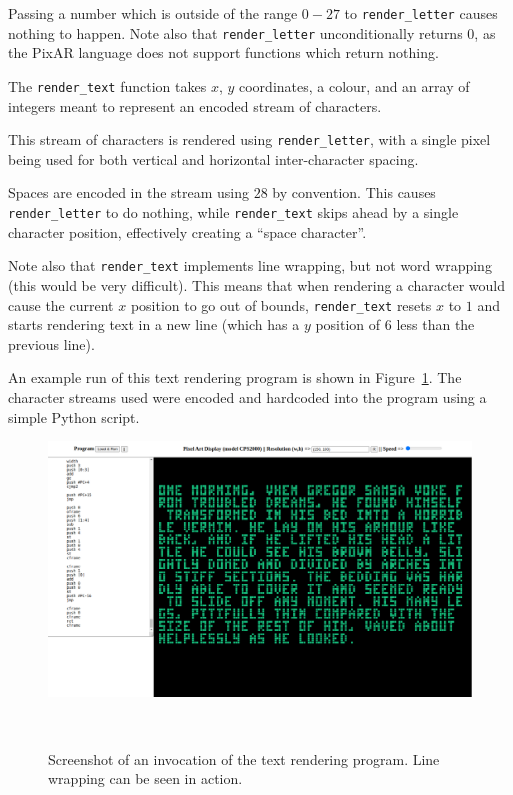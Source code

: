 \documentclass[11pt,a4paper]{scrartcl}
\begin{document}
Passing a number which is outside of the range $0-27$ to \verb|render_letter| causes nothing to happen. Note also that \verb|render_letter| unconditionally returns $0$, as the PixAR language does not support functions which return nothing.

The \verb|render_text| function takes $x$, $y$ coordinates, a colour, and an array of integers meant to represent an encoded stream of characters.

This stream of characters is rendered using \verb|render_letter|, with a single pixel being used for both vertical and horizontal inter-character spacing.

Spaces are encoded in the stream using $28$ by convention. This causes \verb|render_letter| to do nothing, while \verb|render_text| skips ahead by a single character position, effectively creating a ``space character''.

Note also that \verb|render_text| implements line wrapping, but not word wrapping (this would be very difficult). This means that when rendering a character would cause the current $x$ position to go out of bounds, \verb|render_text| resets $x$ to $1$ and starts rendering text in a new line (which has a $y$ position of $6$ less than the previous line).

An example run of this text rendering program is shown in Figure~\ref{fig:text-render}. The
character streams used were encoded and hardcoded into the program using a simple Python script.

\begin{figure}
  \centering
  \includegraphics[width=\textwidth]{text_render}
  \caption{Screenshot of an invocation of the text rendering program. Line wrapping can be seen in action.}~\label{fig:text-render}
\end{figure}
\end{document}
